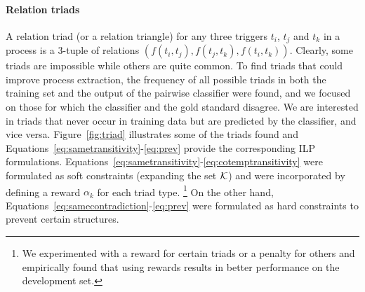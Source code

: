 \paragraph{Relation triads} 
A relation triad (or a relation triangle) for any three triggers $t_{i}$, $t_{j}$ and $t_{k}$ in a process is a 3-tuple of relations $(f(t_i, t_j),f(t_j, t_k),f(t_i, t_k))$. Clearly, some triads are impossible while others are quite common. To find triads that could improve process extraction, the frequency of all possible triads in both the training set and the output of the pairwise classifier were found, and we focused on those for which the classifier and the gold standard disagree. We are interested in triads that never occur in training data but are predicted by the classifier, and vice versa. Figure~\ref{fig:triad} illustrates some of the triads found and Equations~\ref{eq:sametransitivity}-\ref{eq:prev} provide the corresponding ILP formulations. Equations~\ref{eq:sametransitivity}-\ref{eq:cotemptransitivity} were formulated as soft constraints (expanding the set $\mathcal{K}$) and were incorporated by defining a reward $\alpha_k$ for each triad type. \footnote{We experimented with a reward for certain triads or a penalty for others and empirically found that using rewards results in better performance on the development set.} On the other hand, Equations~\ref{eq:samecontradiction}-\ref{eq:prev} were formulated as hard constraints to prevent certain structures.

